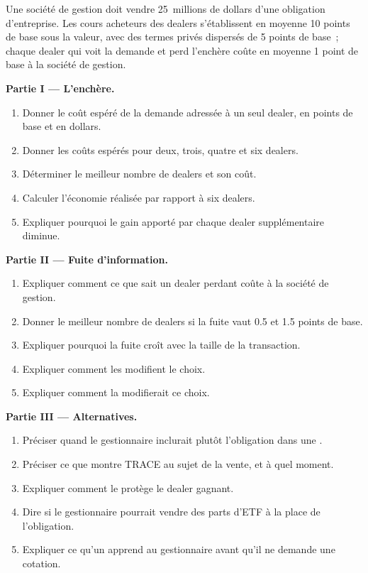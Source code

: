 \begin{problem}\label{pb:m2:how-bonds-trade:1}
Une société de gestion doit vendre 25~millions de dollars d'une obligation d'entreprise. Les cours acheteurs des dealers s'établissent en moyenne 10
points de base sous la valeur, avec des termes privés dispersés de 5 points de base~; chaque dealer qui
voit la demande et perd l'enchère coûte en moyenne 1 point de base à la société de gestion.

\medskip\noindent\textbf{Partie I --- L'enchère.}
\begin{enumerate}
\item Donner le coût espéré de la demande adressée à un seul dealer, en points de base et en dollars.
\item Donner les coûts espérés pour deux, trois, quatre et six dealers.
\item Déterminer le meilleur nombre de dealers et son coût.
\item Calculer l'économie réalisée par rapport à six dealers.
\item Expliquer pourquoi le gain apporté par chaque dealer supplémentaire diminue.
\end{enumerate}

\medskip\noindent\textbf{Partie II --- Fuite d'information.}
\begin{enumerate}[resume]
\item Expliquer comment ce que sait un dealer perdant coûte à la société de gestion.
\item Donner le meilleur nombre de dealers si la fuite vaut 0.5 et 1.5 points de base.
\item Expliquer pourquoi la fuite croît avec la taille de la transaction.
\item Expliquer comment les  modifient le choix.
\item Expliquer comment la  modifierait ce choix.
\end{enumerate}

\medskip\noindent\textbf{Partie III --- Alternatives.}
\begin{enumerate}[resume]
\item Préciser quand le gestionnaire inclurait plutôt l'obligation dans une .
\item Préciser ce que montre TRACE au sujet de la vente, et à quel moment.
\item Expliquer comment le  protège le dealer gagnant.
\item Dire si le gestionnaire pourrait vendre des parts d'ETF à la place de l'obligation.
\item Expliquer ce qu'un  apprend au gestionnaire avant qu'il ne demande une cotation.
\end{enumerate}


\end{problem}
